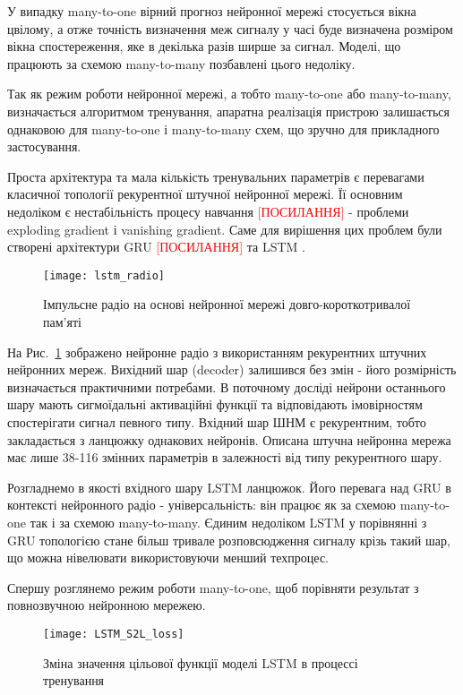 У випадку many-to-one вірний прогноз нейронної мережі стосується вікна цвілому, 
а отже точність визначення меж сигналу у часі буде визначена розміром вікна 
спостереження, яке в декілька разів ширше за сигнал. Моделі, що працюють за 
схемою many-to-many позбавлені цього недоліку.

Так як режим роботи нейронної мережі, а тобто many-to-one або many-to-many,
визначається алгоритмом тренування, апаратна реалізація пристрою залишається 
однаковою для many-to-one і many-to-many схем, що зручно для прикладного 
застосування.

Проста архітектура та мала кількість тренувальних параметрів є 
перевагами класичної топології рекурентної штучної нейронної мережі.
Її основним недоліком є нестабільність процесу навчання 
\textcolor{red}{[ПОСИЛАННЯ]} - проблеми exploding gradient і 
vanishing gradient. Саме для вирішення цих проблем були створені архітектури 
GRU \textcolor{red}{[ПОСИЛАННЯ]} та LSTM \cite{imp:Hochreiter1997}.

\begin{figure}[htbp] \begin{center}
\texttt{[image: lstm\_radio]}
\caption{Імпульсне радіо на основі нейронної мережі 
довго-короткотривалої пам'яті} \label{fig:lstm_radio}
\end{center} \end{figure}

На Рис.~\ref{fig:lstm_radio} зображено нейронне радіо з використанням 
рекурентних штучних нейронних мереж. Вихідний шар (decoder) залишився без 
змін - його розмірність визначається практичними потребами. В поточному 
досліді нейрони останнього шару мають сигмоїдальні активаційні функції 
та відповідають імовірностям спостерігати сигнал певного типу. Вхідний 
шар ШНМ є рекурентним, тобто закладається з ланцюжку однакових нейронів.
Описана штучна нейронна мережа має лише 38-116 змінних параметрів в 
залежності від типу рекурентного шару.

Розгладнемо в якості вхідного шару LSTM ланцюжок. Його перевага над 
GRU в контексті нейронного радіо - універсальність: він працює як за схемою
many-to-one так і за схемою many-to-many. Єдиним недоліком LSTM у порівнянні 
з GRU топологією стане більш тривале розповсюдження сигналу крізь такий шар,
що можна нівелювати використовуючи менший техпроцес.

Спершу розглянемо режим роботи many-to-one, щоб порівняти результат з 
повнозвучною нейронною мережею.

\begin{figure}[htbp] \begin{center}
\texttt{[image: LSTM\_S2L\_loss]}
\caption{Зміна значення цільової функції моделі LSTM 
в процессі тренування} \label{fig:lstm_loss}
\end{center} \end{figure}

